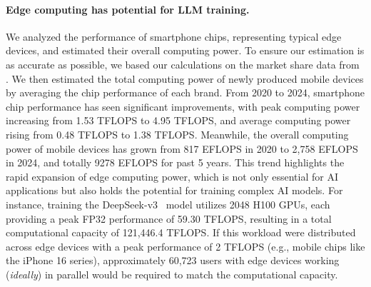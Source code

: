 \paragraph{Edge computing has potential for LLM training.}
We analyzed the performance of smartphone chips, representing typical edge devices, and estimated their overall computing power.
To ensure our estimation is as accurate as possible, we based our calculations on the market share data from \citet{canalys2025}.
We then estimated the total computing power of newly produced mobile devices by averaging the chip performance of each brand.
From 2020 to 2024, smartphone chip performance has seen significant improvements, with peak computing power increasing from 1.53 TFLOPS to 4.95 TFLOPS, and average computing power rising from 0.48 TFLOPS to 1.38 TFLOPS. Meanwhile, the overall computing power of mobile devices has grown from 817 EFLOPS in 2020 to 2,758 EFLOPS in 2024, and totally 9278 EFLOPS for past 5 years. This trend highlights the rapid expansion of edge computing power, which is not only essential for AI applications but also holds the potential for training complex AI models.
For instance, training the DeepSeek-v3~\cite{liu2024deepseek} model utilizes 2048 H100 GPUs, each providing a peak FP32 performance of 59.30 TFLOPS, resulting in a total computational capacity of 121,446.4 TFLOPS. If this workload were distributed across edge devices with a peak performance of 2 TFLOPS (e.g., mobile chips like the iPhone 16 series), approximately 60,723 users with edge devices working (\textit{ideally}) in parallel would be required to match the computational capacity. 

